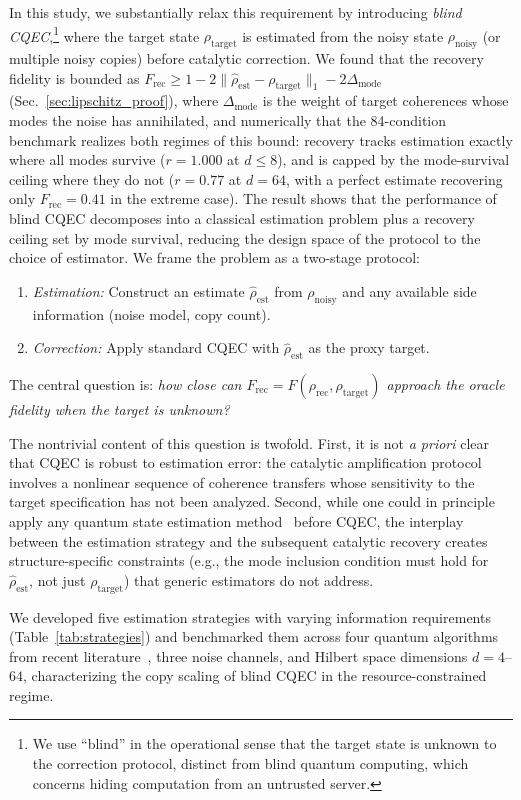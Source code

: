 \documentclass[12pt,a4paper]{article}
\newcommand{\Frec}{F_\mathrm{rec}}
\newcommand{\rhot}{\rho_\mathrm{target}}
\newcommand{\rhon}{\rho_\mathrm{noisy}}
\newcommand{\rhor}{\rho_\mathrm{rec}}
\newcommand{\rhoe}{\hat{\rho}_\mathrm{est}}
\begin{document}
In this study, we substantially relax this requirement by introducing \emph{blind CQEC},\footnote{We use ``blind'' in the operational sense that the target state is unknown to the correction protocol, distinct from blind quantum computing, which concerns hiding computation from an untrusted server.} where the target state $\rhot$ is estimated from the noisy state $\rhon$ (or multiple noisy copies) before catalytic correction.
We found that the recovery fidelity is bounded as $\Frec \geq 1 - 2\|\rhoe - \rhot\|_1 - 2\Delta_\mathrm{mode}$ (Sec.~\ref{sec:lipschitz_proof}), where $\Delta_\mathrm{mode}$ is the weight of target coherences whose modes the noise has annihilated, and numerically that the 84-condition benchmark realizes both regimes of this bound: recovery tracks estimation exactly where all modes survive ($r = 1.000$ at $d \leq 8$), and is capped by the mode-survival ceiling where they do not ($r = 0.77$ at $d = 64$, with a perfect estimate recovering only $\Frec = 0.41$ in the extreme case).
The result shows that the performance of blind CQEC decomposes into a classical estimation problem plus a recovery ceiling set by mode survival, reducing the design space of the protocol to the choice of estimator.
We frame the problem as a two-stage protocol:
\begin{enumerate}
\item \emph{Estimation:} Construct an estimate $\rhoe$ from $\rhon$ and any available side information (noise model, copy count).
\item \emph{Correction:} Apply standard CQEC with $\rhoe$ as the proxy target.
\end{enumerate}
The central question is: \emph{how close can $\Frec = F(\rhor, \rhot)$ approach the oracle fidelity when the target is unknown?}

The nontrivial content of this question is twofold.
First, it is not \emph{a priori} clear that CQEC is robust to estimation error: the catalytic amplification protocol involves a nonlinear sequence of coherence transfers whose sensitivity to the target specification has not been analyzed.
Second, while one could in principle apply any quantum state estimation method~\cite{Hradil1997,Gross2010,Haah2017} before CQEC, the interplay between the estimation strategy and the subsequent catalytic recovery creates structure-specific constraints (e.g., the mode inclusion condition must hold for $\rhoe$, not just $\rhot$) that generic estimators do not address.

We developed five estimation strategies with varying information requirements (Table~\ref{tab:strategies}) and benchmarked them across four quantum algorithms from recent literature~\cite{Chen2021,Ivashkov2024,Clinton2026,Regev2024}, three noise channels, and Hilbert space dimensions $d = 4$--$64$, characterizing the copy scaling of blind CQEC in the resource-constrained regime.
\end{document}
